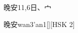 \begin{entry}{晚安}{11,6}{⽇、⼧}
  \begin{phonetics}{晚安}{wan3'an1}[][HSK 2]
  \end{phonetics}
\end{entry}
